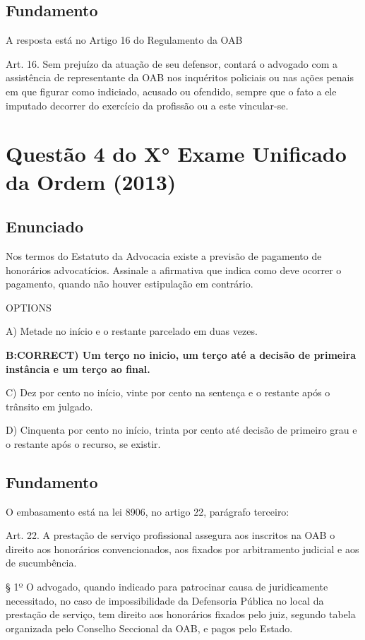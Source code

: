 \documentclass[12pt]{article}
\begin{document}
\subsection{Fundamento}

A resposta está no Artigo 16 do Regulamento da OAB

Art.  16.  Sem  prejuízo  da  atuação  de  seu  defensor,  contará  o  advogado  com  a  assistência  de  representante da OAB nos inquéritos policiais ou nas ações penais em que figurar como indiciado, acusado ou ofendido, sempre que o fato a ele imputado decorrer do exercício da profissão ou a este vincular-se.


\section{Questão 4 do X° Exame Unificado da Ordem (2013)}

\subsection{Enunciado}

Nos termos do Estatuto da Advocacia existe a previsão de 
pagamento de honorários advocatícios. Assinale a afirmativa 
que indica como deve ocorrer o pagamento, quando não 
houver estipulação em contrário.  
 
OPTIONS

A) Metade no início e o restante parcelado em duas vezes. 

\textbf{B:CORRECT) Um terço no inicio, um terço até a decisão de primeira instância e um terço ao final. }

C) Dez por cento no início, vinte por cento na sentença e o 
restante após o trânsito em julgado. 

D) Cinquenta por cento no início, trinta por cento até decisão 
de primeiro grau e o restante após o recurso, se existir. 

\subsection{Fundamento}

O embasamento está na lei 8906, no artigo 22, parágrafo terceiro:

Art. 22. A prestação de serviço profissional assegura aos inscritos na OAB o direito aos honorários convencionados, aos fixados por arbitramento judicial e aos de sucumbência.

§ 1º O advogado, quando indicado para patrocinar causa de juridicamente necessitado, no caso de impossibilidade da Defensoria Pública no local da prestação de serviço, tem direito aos honorários fixados pelo juiz, segundo tabela organizada pelo Conselho Seccional 
da OAB, e pagos pelo Estado.
\end{document}
